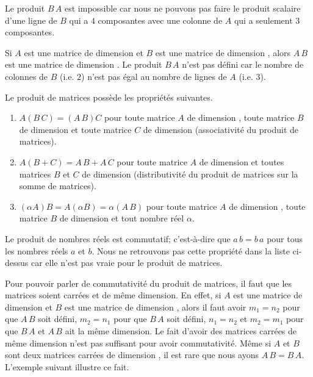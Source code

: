 {\begin{egg}
Le produit $B\,A$ est impossible car nous ne pouvons pas faire le produit
scalaire d'une ligne de $B$ qui a $4$ composantes avec une colonne de
$A$ qui a seulement $3$ composantes.
\end{egg}

\begin{egg}
Si $A$ est une matrice de dimension  et $B$ est une matrice
de dimension , alors $A\,B$ est une matrice de dimension
.  Le produit $B\,A$ n'est pas défini car le nombre de
colonnes de $B$ (i.e. $2$) n'est pas égal au nombre de lignes de $A$
(i.e. $3$).
\end{egg}

Le produit de matrices possède les propriétés suivantes.

\begin{focus}{\prp}
\begin{enumerate}
\item $A(B\,C)= (A\,B)C$ pour toute matrice $A$ de dimension
, toute matrice $B$ de dimension  et toute matrice
$C$ de dimension  (associativité du produit de matrices).
\item $A(B+C) = A\,B + A\,C$ pour toute matrice $A$ de dimension
 et toutes matrices $B$ et $C$ de dimension 
(distributivité du produit de matrices sur la somme de matrices).
\item $(\alpha A)B = A(\alpha B) = \alpha (A\,B)$ pour toute matrice
$A$ de dimension , toute matrice $B$ de dimension 
et tout nombre réel $\alpha$.
\end{enumerate}
\end{focus}

Le produit de nombres réels est commutatif; c'est-à-dire que
$a\,b=b\,a$ pour tous les nombres réels $a$ et $b$.  Nous ne retrouvons
pas cette propriété dans la liste ci-dessus car elle n'est pas vraie
pour le produit de matrices.

Pour pouvoir parler de commutativité du produit de matrices, il faut
que les matrices soient carrées et de même dimension.  En effet, si
$A$ est une matrice de dimension  et $B$ est une matrice
de dimension , alors il faut avoir $m_1 = n_2$ pour que
$A\,B$ soit défini, $m_2 = n_1$ pour que $B\,A$ soit défini, $n_1=n_2$
et $m_2 = m_1$ pour que $B\,A$ et $A\,B$ ait la même dimension.  Le
fait d'avoir des matrices carrées de même dimension n'est pas
suffisant pour avoir commutativité.  Même si $A$ et $B$ sont deux
matrices carrées de dimension \nn, il est rare que nous ayons
$A\,B = B\,A$.  L'exemple suivant illustre ce fait.

}
